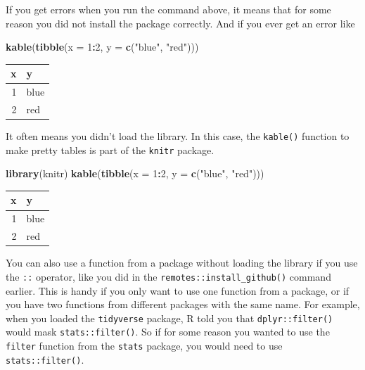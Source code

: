 \documentclass[
]{book}
\newenvironment{Shaded}{\begin{snugshade}}{\end{snugshade}}
\newcommand{\DataTypeTok}[1]{\textcolor[rgb]{0.13,0.29,0.53}{#1}}
\newcommand{\DecValTok}[1]{\textcolor[rgb]{0.00,0.00,0.81}{#1}}
\newcommand{\KeywordTok}[1]{\textcolor[rgb]{0.13,0.29,0.53}{\textbf{#1}}}
\newcommand{\NormalTok}[1]{#1}
\newcommand{\OperatorTok}[1]{\textcolor[rgb]{0.81,0.36,0.00}{\textbf{#1}}}
\newcommand{\StringTok}[1]{\textcolor[rgb]{0.31,0.60,0.02}{#1}}
\begin{document}
If you get errors when you run the command above, it means that for some reason
you did not install the package correctly. And if you ever get an error like

\begin{Shaded}
\begin{Highlighting}[]
\KeywordTok{kable}\NormalTok{(}\KeywordTok{tibble}\NormalTok{(}\DataTypeTok{x =} \DecValTok{1}\OperatorTok{:}\DecValTok{2}\NormalTok{, }\DataTypeTok{y =} \KeywordTok{c}\NormalTok{(}\StringTok{"blue"}\NormalTok{, }\StringTok{"red"}\NormalTok{)))}
\end{Highlighting}
\end{Shaded}

\begin{tabular}{r|l}
\hline
x & y\\
\hline
1 & blue\\
\hline
2 & red\\
\hline
\end{tabular}

It often means you didn't load the library. In this case, the \texttt{kable()} function
to make pretty tables is part of the \texttt{knitr} package.

\begin{Shaded}
\begin{Highlighting}[]
\KeywordTok{library}\NormalTok{(knitr)}
\KeywordTok{kable}\NormalTok{(}\KeywordTok{tibble}\NormalTok{(}\DataTypeTok{x =} \DecValTok{1}\OperatorTok{:}\DecValTok{2}\NormalTok{, }\DataTypeTok{y =} \KeywordTok{c}\NormalTok{(}\StringTok{"blue"}\NormalTok{, }\StringTok{"red"}\NormalTok{)))}
\end{Highlighting}
\end{Shaded}

\begin{tabular}{r|l}
\hline
x & y\\
\hline
1 & blue\\
\hline
2 & red\\
\hline
\end{tabular}

You can also use a function from a package without loading the library if you
use the \texttt{::} operator, like you did in the \texttt{remotes::install\_github()} command
earlier. This is handy if you only want to use one function from a package, or
if you have two functions from different packages with the same name. For example,
when you loaded the \texttt{tidyverse} package, R told you that \texttt{dplyr::filter()} would
mask \texttt{stats::filter()}. So if for some reason you wanted to use the \texttt{filter} function
from the \texttt{stats} package, you would need to use \texttt{stats::filter()}.
\end{document}
